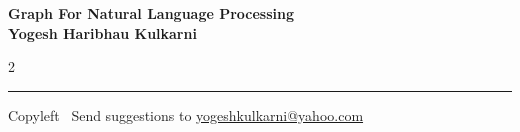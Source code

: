 \documentclass[8pt,landscape]{article}
\begin{document}
\footnotesize


\begin{center}
\Large{\textbf{Graph For Natural Language Processing\\ Yogesh Haribhau Kulkarni}}  
\end{center}

\begin{multicols}{2}

\end{multicols}

\rule{\linewidth}{0.25pt}
\scriptsize
Copyleft \textcopyleft\  Send suggestions to 
\href{http://www.yogeshkulkarni.com}{yogeshkulkarni@yahoo.com}
\end{document}
